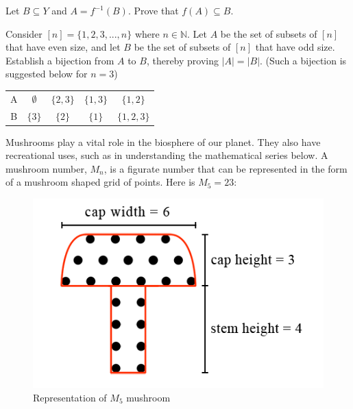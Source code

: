 \documentclass[addpoints]{exam}
\begin{document}
\begin{questions}
\question[15] Let $B \subseteq Y$ and $A = f^{-1}(B)$. Prove that $f(A) \subseteq B$.
  \begin{solution}
  \end{solution}

\question[15] Consider $[n] = \{1,2,3,...,n\}$ where $n \in \mathbb{N}$. Let $A$ be the set of subsets of $[n]$ that have even size, and let $B$ be the set of subsets of $[n]$ that have odd size. Establish a bijection from $A$ to $B$, thereby proving $|A| = |B|$. (Such a bijection is suggested below for $n = 3$) 

\begin{center}
\begin{tabular}{ c c c c c}
 A & $\emptyset$ & $\{2,3\}$ & $\{1,3\}$ & $\{1,2\}$ \\ 
 B & $\{3\}$ & $\{2\}$ & $\{1\}$ & $\{1,2,3\}$
 
\end{tabular}
\end{center}

  \begin{solution}
  \end{solution}
  
\question Mushrooms play a vital role in the biosphere of our planet. They also have recreational uses, such as in understanding the mathematical series below. A mushroom number, $M_n$, is a figurate number that can be represented in the form of a mushroom shaped grid of points. Here is $M_5=23$:

\begin{figure}[h]
  \centering
  \includegraphics[scale=1.0]{m5_figurate.png}
  \caption{Representation of $M_5$ mushroom}
  \label{fig:mushroom_anatomy}
\end{figure}


\end{questions}
\end{document}
